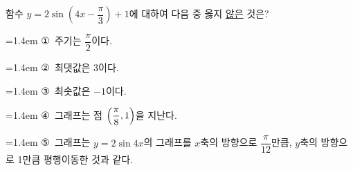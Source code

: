함수 $y=2\sin\left(4x-\dfrac{\pi}{3}\right)+1$에 대하여 다음 중 옳지 \underline{않은} 것은?
\par\medskip\par\noindent\hangindent=1.4em {\small ①}\ 주기는 $\dfrac{\pi}{2}$이다.\par\noindent\hangindent=1.4em {\small ②}\ 최댓값은 3이다.\par\noindent\hangindent=1.4em {\small ③}\ 최솟값은 $-1$이다.\par\noindent\hangindent=1.4em {\small ④}\ 그래프는 점 $\left(\dfrac{\pi}{8}{,}\mkern3mu\mathopen{}1\right)$을 지난다.\par\noindent\hangindent=1.4em {\small ⑤}\ 그래프는 $y=2\sin 4x$의 그래프를 $x$축의 방향으로 $\dfrac{\pi}{12}$만큼, $y$축의 방향으로 1만큼 평행이동한 것과 같다.\par\medskip
